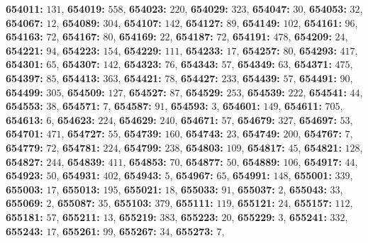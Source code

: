 \textsf{\bfseries 654011:} $131$, \textsf{\bfseries 654019:} $558$, \textsf{\bfseries 654023:} $220$, \textsf{\bfseries 654029:} $323$, \textsf{\bfseries 654047:} $30$, \textsf{\bfseries 654053:} $32$, \textsf{\bfseries 654067:} $12$, \textsf{\bfseries 654089:} $304$, \textsf{\bfseries 654107:} $142$, \textsf{\bfseries 654127:} $89$, \textsf{\bfseries 654149:} $102$, \textsf{\bfseries 654161:} $96$, \textsf{\bfseries 654163:} $72$, \textsf{\bfseries 654167:} $80$, \textsf{\bfseries 654169:} $22$, \textsf{\bfseries 654187:} $72$, \textsf{\bfseries 654191:} $478$, \textsf{\bfseries 654209:} $24$, \textsf{\bfseries 654221:} $94$, \textsf{\bfseries 654223:} $154$, \textsf{\bfseries 654229:} $111$, \textsf{\bfseries 654233:} $17$, \textsf{\bfseries 654257:} $80$, \textsf{\bfseries 654293:} $417$, \textsf{\bfseries 654301:} $65$, \textsf{\bfseries 654307:} $142$, \textsf{\bfseries 654323:} $76$, \textsf{\bfseries 654343:} $57$, \textsf{\bfseries 654349:} $63$, \textsf{\bfseries 654371:} $475$, \textsf{\bfseries 654397:} $85$, \textsf{\bfseries 654413:} $363$, \textsf{\bfseries 654421:} $78$, \textsf{\bfseries 654427:} $233$, \textsf{\bfseries 654439:} $57$, \textsf{\bfseries 654491:} $90$, \textsf{\bfseries 654499:} $305$, \textsf{\bfseries 654509:} $127$, \textsf{\bfseries 654527:} $87$, \textsf{\bfseries 654529:} $253$, \textsf{\bfseries 654539:} $222$, \textsf{\bfseries 654541:} $44$, \textsf{\bfseries 654553:} $38$, \textsf{\bfseries 654571:} $7$, \textsf{\bfseries 654587:} $91$, \textsf{\bfseries 654593:} $3$, \textsf{\bfseries 654601:} $149$, \textsf{\bfseries 654611:} $705$, \textsf{\bfseries 654613:} $6$, \textsf{\bfseries 654623:} $224$, \textsf{\bfseries 654629:} $240$, \textsf{\bfseries 654671:} $57$, \textsf{\bfseries 654679:} $327$, \textsf{\bfseries 654697:} $53$, \textsf{\bfseries 654701:} $471$, \textsf{\bfseries 654727:} $55$, \textsf{\bfseries 654739:} $160$, \textsf{\bfseries 654743:} $23$, \textsf{\bfseries 654749:} $200$, \textsf{\bfseries 654767:} $7$, \textsf{\bfseries 654779:} $72$, \textsf{\bfseries 654781:} $224$, \textsf{\bfseries 654799:} $238$, \textsf{\bfseries 654803:} $109$, \textsf{\bfseries 654817:} $45$, \textsf{\bfseries 654821:} $128$, \textsf{\bfseries 654827:} $244$, \textsf{\bfseries 654839:} $411$, \textsf{\bfseries 654853:} $70$, \textsf{\bfseries 654877:} $50$, \textsf{\bfseries 654889:} $106$, \textsf{\bfseries 654917:} $44$, \textsf{\bfseries 654923:} $50$, \textsf{\bfseries 654931:} $402$, \textsf{\bfseries 654943:} $5$, \textsf{\bfseries 654967:} $65$, \textsf{\bfseries 654991:} $148$, \textsf{\bfseries 655001:} $339$, \textsf{\bfseries 655003:} $17$, \textsf{\bfseries 655013:} $195$, \textsf{\bfseries 655021:} $18$, \textsf{\bfseries 655033:} $91$, \textsf{\bfseries 655037:} $2$, \textsf{\bfseries 655043:} $33$, \textsf{\bfseries 655069:} $2$, \textsf{\bfseries 655087:} $35$, \textsf{\bfseries 655103:} $379$, \textsf{\bfseries 655111:} $119$, \textsf{\bfseries 655121:} $24$, \textsf{\bfseries 655157:} $112$, \textsf{\bfseries 655181:} $57$, \textsf{\bfseries 655211:} $13$, \textsf{\bfseries 655219:} $383$, \textsf{\bfseries 655223:} $20$, \textsf{\bfseries 655229:} $3$, \textsf{\bfseries 655241:} $332$, \textsf{\bfseries 655243:} $17$, \textsf{\bfseries 655261:} $99$, \textsf{\bfseries 655267:} $34$, \textsf{\bfseries 655273:} $7$, 
